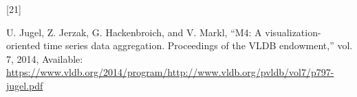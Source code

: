 \documentclass{article}
\newlength{\cslhangindent}
\newlength{\csllabelwidth}
\newlength{\cslentryspacingunit} %
\newenvironment{CSLReferences}[2] %
 {%
  \setlength{\parindent}{0pt}
  \ifodd #1
  \let\oldpar\par
  \def\par{\hangindent=\cslhangindent\oldpar}
  \fi
  \setlength{\parskip}{#2\cslentryspacingunit}
 }%
 {}
\newcommand{\CSLLeftMargin}[1]{\parbox[t]{\csllabelwidth}{#1}}
\newcommand{\CSLRightInline}[1]{\parbox[t]{\linewidth - \csllabelwidth}{#1}\break}
\begin{document}
\begin{CSLReferences}{0}{0}
\leavevmode{}%
\CSLLeftMargin{{[}21{]} }
\CSLRightInline{U. Jugel, Z. Jerzak, G. Hackenbroich, and V. Markl,
{``M4: A visualization-oriented time series data aggregation.
Proceedings of the VLDB endowment,''} vol. 7, 2014, Available:
\url{https://www.vldb.org/2014/program/http://www.vldb.org/pvldb/vol7/p797-jugel.pdf}}

\end{CSLReferences}



\end{document}

